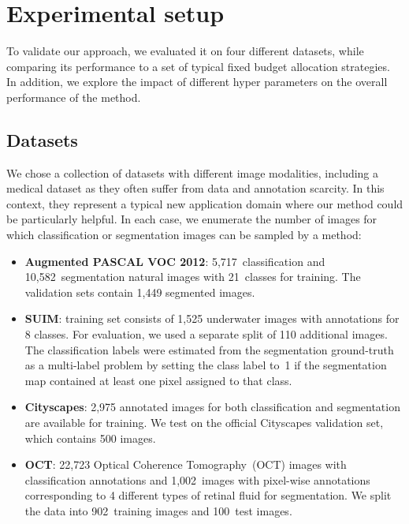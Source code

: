 \section{Experimental setup}
\label{sec:experiments_fullweak}

To validate our approach, we evaluated it on four different datasets, while comparing its performance to a set of typical fixed budget allocation strategies. In addition, we explore the impact of different hyper parameters on the overall performance of the method. 

\subsection{Datasets} 
We chose a collection of datasets with different image modalities, including a medical dataset as they often suffer from data and annotation scarcity. In this context, they represent a typical new application domain where our method could be particularly helpful. In each case, we enumerate the number of images for which classification or segmentation images can be sampled by a method:
\begin{itemize}[parsep=1mm, topsep=1mm] %
    \item \textbf{Augmented PASCAL VOC 2012}: 5,717~classification and 10,582~segmentation natural images with 21~classes for training. The validation sets contain 1,449 segmented images.
    \item \textbf{SUIM}: training set consists of 1,525 underwater images with annotations for 8 classes. For evaluation, we used a separate split of 110 additional images. The classification labels were estimated from the segmentation ground-truth as a multi-label problem by setting the class label to~1 if the segmentation map contained at least one pixel assigned to that class.
    \item \textbf{Cityscapes}: 2,975 annotated images for both classification and segmentation are available for training. We test on the official Cityscapes validation set, which contains 500 images. 
    \item \textbf{OCT}: 22,723 Optical Coherence Tomography~(OCT) images with classification annotations and 1,002~images with pixel-wise annotations corresponding to 4 different types of retinal fluid for segmentation. We split the data into 902~training images and 100~test images.
\end{itemize}

